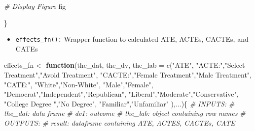 \documentclass[
]{article}
\newenvironment{Shaded}{\begin{snugshade}}{\end{snugshade}}
\newcommand{\AttributeTok}[1]{\textcolor[rgb]{0.77,0.63,0.00}{#1}}
\newcommand{\CommentTok}[1]{\textcolor[rgb]{0.56,0.35,0.01}{\textit{#1}}}
\newcommand{\ControlFlowTok}[1]{\textcolor[rgb]{0.13,0.29,0.53}{\textbf{#1}}}
\newcommand{\FunctionTok}[1]{\textcolor[rgb]{0.00,0.00,0.00}{#1}}
\newcommand{\NormalTok}[1]{#1}
\newcommand{\OtherTok}[1]{\textcolor[rgb]{0.56,0.35,0.01}{#1}}
\newcommand{\StringTok}[1]{\textcolor[rgb]{0.31,0.60,0.02}{#1}}
\providecommand{\tightlist}{%
  \setlength{\itemsep}{0pt}\setlength{\parskip}{0pt}}
\begin{document}
\begin{Shaded}
\begin{Highlighting}[]
  \CommentTok{\# Display Figure }
\NormalTok{  fig}
  
\NormalTok{\}}
\end{Highlighting}
\end{Shaded}

\begin{itemize}
\tightlist
\item
  \texttt{effects\_fn():} Wrapper function to calculated ATE, ACTEs,
  CACTEs, and CATEs
\end{itemize}

\begin{Shaded}
\begin{Highlighting}[]
\NormalTok{effects\_fn }\OtherTok{\textless{}{-}} \ControlFlowTok{function}\NormalTok{(the\_dat,}
\NormalTok{                       the\_dv,}
                       \AttributeTok{the\_lab =} \FunctionTok{c}\NormalTok{(}\StringTok{"ATE"}\NormalTok{,}
                                   \StringTok{"ACTE:"}\NormalTok{,}\StringTok{"Select Treatment"}\NormalTok{,}\StringTok{"Avoid Treatment"}\NormalTok{,}
                                   \StringTok{"CACTE:"}\NormalTok{,}\StringTok{"Female Treatment"}\NormalTok{,}\StringTok{"Male Treatment"}\NormalTok{,}
                                   \StringTok{"CATE:"}\NormalTok{,}
                                   \StringTok{"White"}\NormalTok{,}\StringTok{"Non{-}White"}\NormalTok{,}
                                   \StringTok{"Male"}\NormalTok{,}\StringTok{"Female"}\NormalTok{,}
                                   \StringTok{"Democrat"}\NormalTok{,}\StringTok{"Independent"}\NormalTok{,}\StringTok{"Republican"}\NormalTok{,}
                                   \StringTok{"Liberal"}\NormalTok{,}\StringTok{"Moderate"}\NormalTok{,}\StringTok{"Conservative"}\NormalTok{,}
                                   \StringTok{"College Degree "}\NormalTok{,}\StringTok{"No Degree"}\NormalTok{,}
                                   \StringTok{"Familiar"}\NormalTok{,}\StringTok{"Unfamiliar"}
\NormalTok{                       ),...)\{}
  \CommentTok{\# INPUTS:}
    \CommentTok{\# the\_dat: data frame}
    \CommentTok{\# dv1: outcome}
    \CommentTok{\# the\_lab: object containing row names}
  \CommentTok{\# OUTPUTS:}
    \CommentTok{\# result: dataframe containing ATE, ACTES, CACTEs, CATE}
  

\end{Highlighting}
\end{Shaded}
\end{document}

